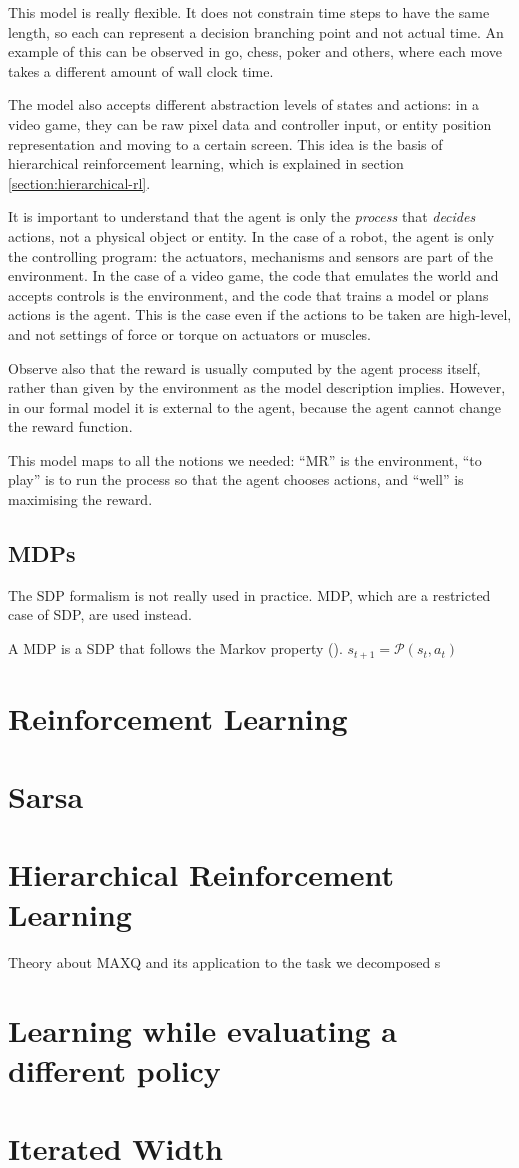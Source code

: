 This model is really flexible. It does not constrain time steps to have the same
length, so each can represent a decision branching point and not actual time. An
example of this can be observed in go, chess, poker and others, where each move
takes a different amount of wall clock time.

The model also accepts different abstraction levels of states and actions: in a
video game, they can be raw pixel data and controller input, or entity position
representation and moving to a certain screen. This idea is the basis of
hierarchical reinforcement learning, which is explained in section
\ref{section:hierarchical-rl}.

It is important to understand that the agent is only the \emph{process} that
\emph{decides} actions, not a physical object or entity. In the case of a robot, the
agent is only the controlling program: the actuators, mechanisms and sensors are part
of the environment. In the case of a video game, the code that emulates
the world and accepts controls is the environment, and the code that trains a
model or plans actions is the agent. This is the case even if the actions to be
taken are high-level, and not settings of force or torque on actuators or
muscles.

Observe also that the reward is usually computed by the agent process itself,
rather than given by the environment as the model description implies. However,
in our formal model it is external to the agent, because the agent cannot change
the reward function.

This model maps to all the notions we needed: ``\acl{MR}'' is the environment,
``to play'' is to run the process so that the agent chooses actions, and
``well'' is maximising the reward.

\subsection{\aclp{MDP}}
The \ac{SDP} formalism is not really used in practice. \acf{MDP}, which are a
restricted case of \ac{SDP}, are used instead.

A \acl{MDP} is a \acl{SDP} that follows the Markov property
(\cite[Section~3.5]{sutton1998introduction}). $s_{t+1} = \mathcal{P}(s_t, a_t)$

\section{Reinforcement Learning}
\section{Sarsa}
\section{Hierarchical Reinforcement Learning\label{section:hierarchical-rl}}
Theory about MAXQ and its application to the task we decomposed
s
\section{Learning while evaluating a different policy}
\section{Iterated Width}